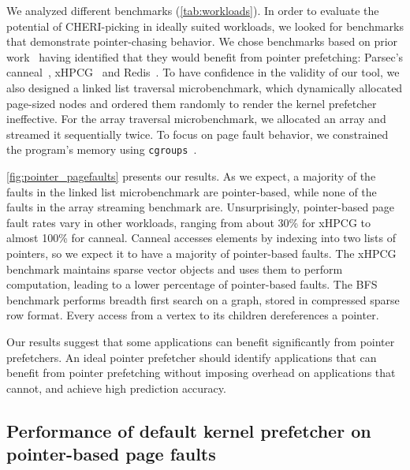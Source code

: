 We analyzed different benchmarks (\autoref{tab:workloads}). In order to evaluate the potential of CHERI-picking in ideally suited workloads, we looked for benchmarks that demonstrate pointer-chasing behavior. We chose benchmarks based on prior work~\cite{classifying, dilos} having identified that they would benefit from pointer prefetching:
Parsec's canneal~\cite{parsec}, xHPCG~\cite{hpcg} and Redis~\cite{redis}.
To have confidence in the validity of our tool, we also designed a linked list traversal microbenchmark, which dynamically allocated page-sized nodes and ordered them randomly to render the kernel prefetcher ineffective. 
For the array traversal microbenchmark, we allocated an array and streamed it sequentially twice. 
To focus on page fault behavior, we constrained the program's memory using \texttt{cgroups}~\cite{cgroups}.

\autoref{fig:pointer_pagefaults} presents our results. As we expect, a majority of the faults in the linked list microbenchmark are pointer-based, while none of the faults in the array streaming benchmark are. 
Unsurprisingly, pointer-based page fault rates vary in other workloads, ranging from about 30\% for xHPCG 
to almost 100\% for canneal. 
Canneal accesses elements by indexing into two lists of pointers, so we expect it to have a majority of pointer-based faults. 
The xHPCG benchmark maintains sparse vector objects and uses them to perform computation, leading to a lower percentage of pointer-based faults. The BFS benchmark performs breadth first search on a graph, stored in compressed sparse row format. Every access from a vertex to its children dereferences a pointer. 

Our results suggest that some applications can benefit significantly from pointer prefetchers.
An ideal pointer prefetcher should identify applications that can benefit from pointer prefetching without imposing overhead on applications that cannot, and achieve high prediction accuracy.



\subsection{Performance of default kernel prefetcher on pointer-based page faults}

